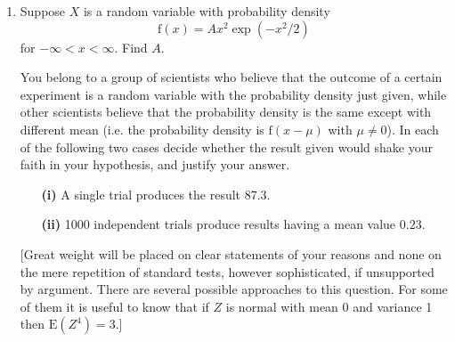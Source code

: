 \documentclass[a4, 11pt]{report}
\newlength{\qspace}
\newcounter{qnumber}
\newenvironment{question}%
 {\vspace{\qspace}
  \begin{enumerate}[\bfseries 1\quad][10]%
    \setcounter{enumi}{\value{qnumber}}%
    \item%
 }
{
  \end{enumerate}
  \filbreak
  \stepcounter{qnumber}
 }
\begin{document}
\begin{question}
Suppose $X$ is a random variable with probability density 
\[
\mathrm{f}(x)=Ax^{2}\exp(-x^{2}/2)
\]
for $-\infty<x<\infty.$ Find $A$.


You belong to a group of scientists who believe that the outcome of
a certain experiment is a random variable with the probability density
just given, while other scientists believe that the probability density
is the same except with different mean (i.e. the probability density
is $\mathrm{f}(x-\mu)$ with $\mu\neq0$). In each of the following
two cases decide whether the result given would shake your faith in
your hypothesis, and justify your answer. 

\begin{itemize}
\setlength{\itemsep}{3mm}

\item[\bf (i)] A single trial produces the result 87.3. 
\item[\bf (ii)] 1000 independent trials produce results having a mean value $0.23.$
\end{itemize}

{[}Great weight will be placed on clear statements of your reasons
and none on the mere repetition of standard tests, however sophisticated,
if unsupported by argument. There are several possible approaches
to this question. For some of them it is useful to know that if $Z$
is normal with mean 0 and variance 1 then $\mathrm{E}(Z^{4})=3.${]}

\end{question}
	
\end{document}
